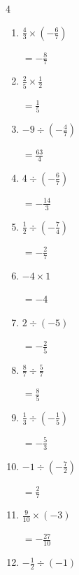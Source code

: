 \begin{multicols}{4}
\begin{enumerate}
        $\displaystyle =\frac{5}{8}$

  \item $\displaystyle \frac{4}{3}\times{}\left(-\frac{6}{7}\right)$

        $\displaystyle =-\frac{8}{7}$

  \item $\displaystyle \frac{2}{5}\times{}\frac{1}{2}$

        $\displaystyle =\frac{1}{5}$

  \item $\displaystyle -9\div{}\left(-\frac{4}{7}\right)$

        $\displaystyle =\frac{63}{4}$

\columnbreak %

  \item $\displaystyle 4\div{}\left(-\frac{6}{7}\right)$

        $\displaystyle =-\frac{14}{3}$

  \item $\displaystyle \frac{1}{2}\div{}\left(-\frac{7}{4}\right)$

        $\displaystyle =-\frac{2}{7}$

  \item $\displaystyle -4\times{}1$

        $\displaystyle =-4$

  \item $\displaystyle 2\div{}\left(-5\right)$

        $\displaystyle =-\frac{2}{5}$

  \item $\displaystyle \frac{8}{7}\div{}\frac{5}{7}$

        $\displaystyle =\frac{8}{5}$

  \item $\displaystyle \frac{1}{3}\div{}\left(-\frac{1}{5}\right)$

        $\displaystyle =-\frac{5}{3}$

  \item $\displaystyle -1\div{}\left(-\frac{7}{2}\right)$

        $\displaystyle =\frac{2}{7}$

  \item $\displaystyle \frac{9}{10}\times{}\left(-3\right)$

        $\displaystyle =-\frac{27}{10}$

  \item $\displaystyle -\frac{1}{2}\div{}\left(-1\right)$


\end{enumerate}
\end{multicols}
